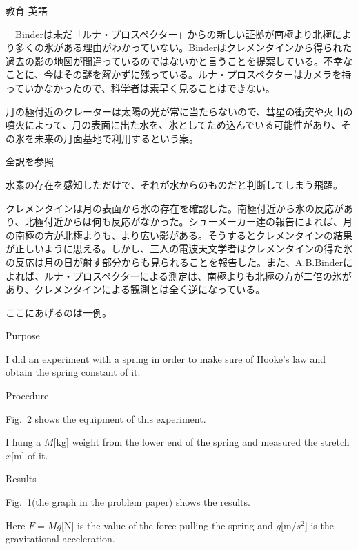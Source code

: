 \documentclass[fleqn]{jbook}
\begin{document}
\begin{answer}{教育 英語}{}
\begin{subanswers}
　Binderは未だ「ルナ・プロスペクター」からの新しい証拠が南極より北極により多くの氷がある理由がわかっていない。Binderはクレメンタインから得られた過去の影の地図が間違っているのではないかと言うことを提案している。不幸なことに、今はその謎を解かずに残っている。ルナ・プロスペクターはカメラを持っていかなかったので、科学者は素早く見ることはできない。
\begin{subsubanswers}
\SubSubAnswer

月の極付近のクレーターは太陽の光が常に当たらないので、彗星の衝突や火山の噴火によって、月の表面に出た水を、氷としてため込んでいる可能性があり、その氷を未来の月面基地で利用するという案。

\SubSubAnswer
全訳を参照

\SubSubAnswer
水素の存在を感知しただけで、それが水からのものだと判断してしまう飛躍。

\SubSubAnswer
クレメンタインは月の表面から氷の存在を確認した。南極付近から氷の反応があり、北極付近からは何も反応がなかった。シューメーカー達の報告によれば、月の南極の方が北極よりも、より広い影がある。そうするとクレメンタインの結果が正しいように思える。しかし、三人の電波天文学者はクレメンタインの得た氷の反応は月の日が射す部分からも見られることを報告した。また、A.B.Binderによれば、ルナ・プロスペクターによる測定は、南極よりも北極の方が二倍の氷があり、クレメンタインによる観測とは全く逆になっている。
\end{subsubanswers}
\SubAnswer
ここにあげるのは一例。

\begin{subsubanswers}
\SubSubAnswer
\baselineskip=12pt

\begin{itemize}
\item Purpose

I  did  an experiment with a spring in order to make sure of Hooke's law
and obtain the spring constant of it.



\parbox[t]{110mm}{
\item Procedure

Fig.~2 shows the equipment of this experiment.


I hung a \( M\)[kg] weight from the lower end of the spring and measured 
the stretch \( x\)[m] of it.



\item Results

Fig.~1(the graph in the problem paper) shows the results.


Here \( F = Mg\)[N] is the value of the force pulling the spring and
\( g\)[m/\( s^{2}\)] is the gravitational acceleration.


}
\end{itemize}
\end{subsubanswers}
\end{subanswers}
\end{answer}
\end{document}
